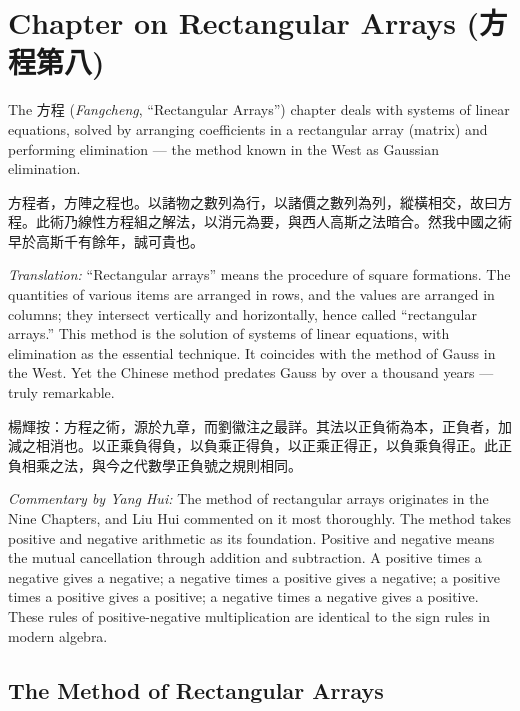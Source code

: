 \documentclass[11pt,a4paper]{article}
\newcommand{\zh}[1]{{#1}}
\newenvironment{chpassage}{%
  \par\medskip
  \begin{center}
  \begin{minipage}{0.95\textwidth}
  \setlength{\parindent}{2em}
  \linespread{1.3}\selectfont
}{%
  \end{minipage}
  \end{center}
  \medskip
}
\begin{document}
\newpage

\section{Chapter on Rectangular Arrays (\zh{方程第八})}
\label{sec:fangcheng}

The \zh{方程} (\textit{Fangcheng}, ``Rectangular Arrays'') chapter deals
with systems of linear equations, solved by arranging coefficients in a
rectangular array (matrix) and performing elimination --- the method known in
the West as Gaussian elimination.

\begin{chpassage}
\zh{方程者，方陣之程也。以諸物之數列為行，以諸價之數列為列，縱橫相交，故曰方程。此術乃線性方程組之解法，以消元為要，與西人高斯之法暗合。然我中國之術早於高斯千有餘年，誠可貴也。}

\medskip
\textit{Translation:} ``Rectangular arrays'' means the procedure of square
formations. The quantities of various items are arranged in rows, and the
values are arranged in columns; they intersect vertically and horizontally,
hence called ``rectangular arrays.'' This method is the solution of systems
of linear equations, with elimination as the essential technique. It
coincides with the method of Gauss in the West. Yet the Chinese method
predates Gauss by over a thousand years --- truly remarkable.
\end{chpassage}

\begin{chpassage}
\zh{楊輝按：方程之術，源於九章，而劉徽注之最詳。其法以正負術為本，正負者，加減之相消也。以正乘負得負，以負乘正得負，以正乘正得正，以負乘負得正。此正負相乘之法，與今之代數學正負號之規則相同。}

\medskip
\textit{Commentary by Yang Hui:} The method of rectangular arrays originates
in the Nine Chapters, and Liu Hui commented on it most thoroughly. The method
takes positive and negative arithmetic as its foundation. Positive and
negative means the mutual cancellation through addition and subtraction. A
positive times a negative gives a negative; a negative times a positive gives
a negative; a positive times a positive gives a positive; a negative times a
negative gives a positive. These rules of positive-negative multiplication
are identical to the sign rules in modern algebra.
\end{chpassage}

\subsection{The Method of Rectangular Arrays}
\end{document}
